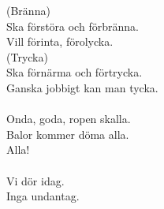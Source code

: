 \documentclass[a6paper, 10pt, twoside]{article}
\begin{document}
\begin{lyrics}
(Bränna)\\
Ska förstöra och förbränna. \\
Vill förinta, förolycka.\\
(Trycka)\\
Ska förnärma och förtrycka. \\
Ganska jobbigt kan man tycka. \\
\\
Onda, goda, ropen skalla. \\
Balor kommer döma alla. \\
Alla!\\
\\
Vi dör idag.\\
Inga undantag.

\end{lyrics}

\end{document}
